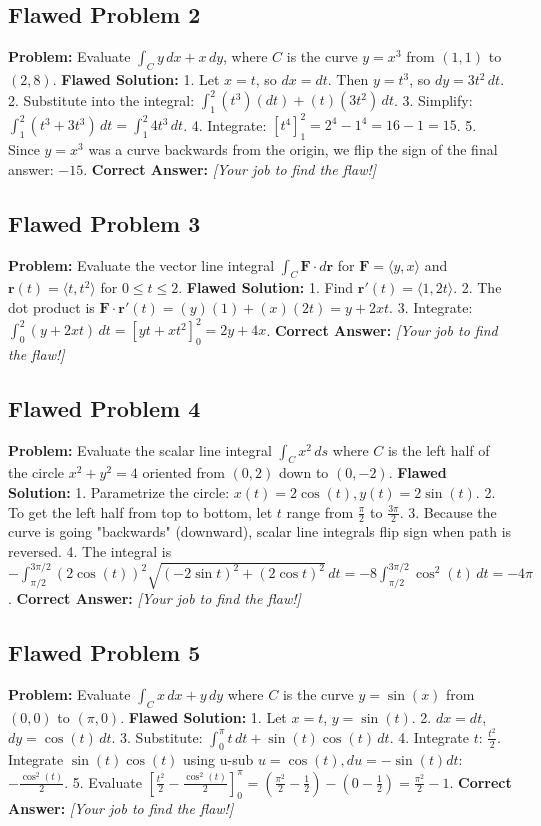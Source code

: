 \documentclass{article}
\begin{document}
\subsection{Flawed Problem 2}
\textbf{Problem:} Evaluate $\int_C y \, dx + x \, dy$, where $C$ is the curve $y = x^3$ from $(1,1)$ to $(2,8)$.
\textbf{Flawed Solution:}
1. Let $x = t$, so $dx = dt$. Then $y = t^3$, so $dy = 3t^2 \, dt$.
2. Substitute into the integral: $\int_1^2 (t^3)(dt) + (t)(3t^2) \, dt$.
3. Simplify: $\int_1^2 (t^3 + 3t^3) \, dt = \int_1^2 4t^3 \, dt$.
4. Integrate: $\left[ t^4 \right]_1^2 = 2^4 - 1^4 = 16 - 1 = 15$.
5. Since $y=x^3$ was a curve backwards from the origin, we flip the sign of the final answer: $-15$.
\textbf{Correct Answer:} \textit{[Your job to find the flaw!]}

\subsection{Flawed Problem 3}
\textbf{Problem:} Evaluate the vector line integral $\int_C \mathbf{F} \cdot d\mathbf{r}$ for $\mathbf{F} = \langle y, x \rangle$ and $\mathbf{r}(t) = \langle t, t^2 \rangle$ for $0 \leq t \leq 2$.
\textbf{Flawed Solution:}
1. Find $\mathbf{r}'(t) = \langle 1, 2t \rangle$.
2. The dot product is $\mathbf{F} \cdot \mathbf{r}'(t) = (y)(1) + (x)(2t) = y + 2xt$.
3. Integrate: $\int_0^2 (y + 2xt) \, dt = \left[ yt + xt^2 \right]_0^2 = 2y + 4x$.
\textbf{Correct Answer:} \textit{[Your job to find the flaw!]}

\subsection{Flawed Problem 4}
\textbf{Problem:} Evaluate the scalar line integral $\int_C x^2 \, ds$ where $C$ is the left half of the circle $x^2 + y^2 = 4$ oriented from $(0,2)$ down to $(0,-2)$.
\textbf{Flawed Solution:}
1. Parametrize the circle: $x(t) = 2\cos(t), y(t) = 2\sin(t)$.
2. To get the left half from top to bottom, let $t$ range from $\frac{\pi}{2}$ to $\frac{3\pi}{2}$.
3. Because the curve is going "backwards" (downward), scalar line integrals flip sign when path is reversed. 
4. The integral is $-\int_{\pi/2}^{3\pi/2} (2\cos(t))^2 \sqrt{(-2\sin t)^2 + (2\cos t)^2} \, dt = -8 \int_{\pi/2}^{3\pi/2} \cos^2(t) \, dt = -4\pi$.
\textbf{Correct Answer:} \textit{[Your job to find the flaw!]}

\subsection{Flawed Problem 5}
\textbf{Problem:} Evaluate $\int_C x \, dx + y \, dy$ where $C$ is the curve $y = \sin(x)$ from $(0,0)$ to $(\pi, 0)$.
\textbf{Flawed Solution:}
1. Let $x = t$, $y = \sin(t)$.
2. $dx = dt$, $dy = \cos(t) \, dt$.
3. Substitute: $\int_0^\pi t \, dt + \sin(t)\cos(t) \, dt$.
4. Integrate $t$: $\frac{t^2}{2}$. Integrate $\sin(t)\cos(t)$ using u-sub $u=\cos(t), du=-\sin(t) dt$: $-\frac{\cos^2(t)}{2}$.
5. Evaluate $\left[ \frac{t^2}{2} - \frac{\cos^2(t)}{2} \right]_0^\pi = (\frac{\pi^2}{2} - \frac{1}{2}) - (0 - \frac{1}{2}) = \frac{\pi^2}{2} - 1$.
\textbf{Correct Answer:} \textit{[Your job to find the flaw!]}
\end{document}
